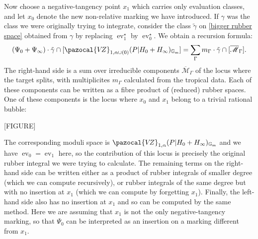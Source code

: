 \documentclass[11pt]{amsart}
\newcommand{\VZ}{\pazocal{V\!Z}}
\newcommand{\st}{\star}
\newcommand{\Gm}{\mathbb{G}_{\text{m}}}
\newcommand{\ev}{\operatorname{ev}}
\newcommand{\Mcal}{\mathcal{M}}
\newcommand{\ol}[1]{\overline{#1}}
\theoremstyle{definition}
\theoremstyle{definition}
\begin{document}
Now choose a negative-tangency point $x_1$ which carries only evaluation classes, and let $x_0$ denote the new non-relative marking we have introduced. If $\gamma$ was the class we were originally trying to integrate, consider the class $\tilde\gamma$ on \eqref{bigger rubber space} obtained from $\gamma$ by replacing $\ev_1^\st$ by $\ev_0^\st$. We obtain a recursion formula:
\begin{equation*} (\Psi_0+\Psi_\infty)\cdot \tilde\gamma \cap [\VZ_{1,\alpha\cup(0)}(P|H_0+H_\infty)_{\Gm}] = \sum_{\Gamma} m_\Gamma \cdot \tilde\gamma \cap [\ol\Mcal_{\Gamma}]. \end{equation*}
The right-hand side is a sum over irreducible components $\ol\Mcal_\Gamma$ of the locus where the target splits, with multiplicites $m_\Gamma$ calculated from the tropical data. Each of these components can be written as a fibre product of (reduced) rubber spaces. One of these components is the locus where $x_0$ and $x_1$ belong to a trivial rational bubble:

[FIGURE]

The corresponding moduli space is $\VZ_{1,\alpha}(P|H_0+H_\infty)_{\Gm}$ and we have $\ev_0=\ev_1$ here, so the contribution of this locus is precisely the original rubber integral we were trying to calculate. The remaining terms on the right-hand side can be written either as a product of rubber integrals of smaller degree (which we can compute recursively), or rubber integrals of the same degree but with no insertion at $x_1$ (which we can compute by forgetting $x_1$). Finally, the left-hand side also has no insertion at $x_1$ and so can be computed by the same method. Here we are assuming that $x_1$ is not the only negative-tangency marking, so that $\Psi_0$ can be interpreted as an insertion on a marking different from $x_1$.
\end{document}
